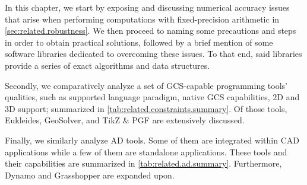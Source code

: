 %
\label{chap:related}
\cleardoublepage{}

\noindent
In this chapter, we start by exposing and discussing numerical accuracy issues
that arise when performing computations with fixed-precision arithmetic in
\cref{sec:related.robustness}.  We then proceed to naming some precautions and
steps in order to obtain practical solutions, followed by a brief mention of
some software libraries dedicated to overcoming these issues.  To that end, said
libraries provide a series of exact algorithms and data structures.

Secondly, we comparatively analyze a set of \ac{GCS}-capable programming tools'
qualities, such as supported language paradigm, native \ac{GCS} capabilities, 2D
and 3D support; summarized in \cref{tab:related.constraints.summary}.  Of those
tools, Eukleides, GeoSolver, and \acs{TikZ} \& \acs{PGF} are extensively
discussed.

Finally, we similarly analyze \ac{AD} tools.  Some of them are integrated within
\ac{CAD} applications while a few of them are standalone applications.  These
tools and their capabilities are summarized in \cref{tab:related.ad.summary}.
Furthermore, Dynamo and Grasshopper are expanded upon.




